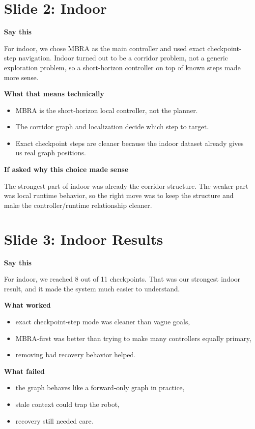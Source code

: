 \documentclass[11pt]{article}
\begin{document}
\section*{Slide 2: Indoor}
\textbf{Say this}

For indoor, we chose MBRA as the main controller and used exact checkpoint-step navigation. Indoor turned out to be a corridor problem, not a generic exploration problem, so a short-horizon controller on top of known steps made more sense.

\textbf{What that means technically}
\begin{itemize}[leftmargin=*]
\item MBRA is the short-horizon local controller, not the planner.
\item The corridor graph and localization decide which step to target.
\item Exact checkpoint steps are cleaner because the indoor dataset already gives us real graph positions.
\end{itemize}

\textbf{If asked why this choice made sense}

The strongest part of indoor was already the corridor structure. The weaker part was local runtime behavior, so the right move was to keep the structure and make the controller/runtime relationship cleaner.

\section*{Slide 3: Indoor Results}
\textbf{Say this}

For indoor, we reached 8 out of 11 checkpoints. That was our strongest indoor result, and it made the system much easier to understand.

\textbf{What worked}
\begin{itemize}[leftmargin=*]
\item exact checkpoint-step mode was cleaner than vague goals,
\item MBRA-first was better than trying to make many controllers equally primary,
\item removing bad recovery behavior helped.
\end{itemize}

\textbf{What failed}
\begin{itemize}[leftmargin=*]
\item the graph behaves like a forward-only graph in practice,
\item stale context could trap the robot,
\item recovery still needed care.
\end{itemize}
\end{document}
